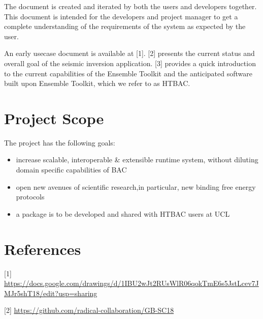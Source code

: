 \documentclass{scrreprt}
\begin{document}
The document is created and iterated by both the users and developers together. This document is intended for the developers and project manager to get a complete understanding of the requirements of the system as expected by the user.

An early usecase document is available at [1]. [2] presents the current status and overall goal of the seismic inversion application. [3] provides a quick introduction to the current capabilities of the Ensemble Toolkit and the anticipated software built upon Ensemble Toolkit, which we refer to as HTBAC. 

\section{Project Scope}

The project has the following goals:

\begin{itemize}[noitemsep]
\item increase scalable, interoperable & extensible runtime system, without diluting domain specific capabilities of BAC
\item open new avenues of scientific research,in particular, new binding free energy protocols
\item a package is to be developed and shared with HTBAC users at UCL
\end{itemize}

\section{References}

[1] \url{https://docs.google.com/drawings/d/1IBU2wJt2RUsWlR06qokTmE6s5JstLcev7JMJr5shT18/edit?usp=sharing}

[2] \url{https://github.com/radical-collaboration/GB-SC18}
\end{document}
